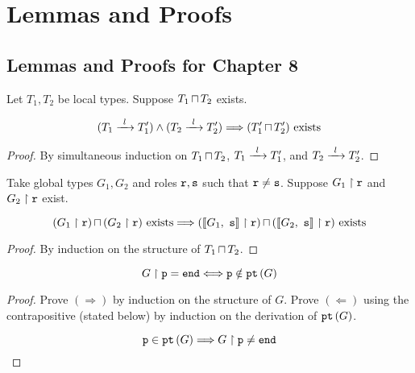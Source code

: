 \chapter{Lemmas and Proofs}

\section{Lemmas and Proofs for Chapter 8}
\label{section:proofs}

\begin{lemma}
Let $T_1, T_2$ be local types.
Suppose ${T_1}\,{\sqcap}\,{T_2}$ exists.

\[
(\treduce{T_1}{T'_1}{l}) \wedge (\treduce{T_2}{T'_2}{l})
	\Longrightarrow
(\tmerge{T'_1}{T'_2}) \text{ exists}
\]

\label{lem:localltspreservemerge}
\end{lemma}

\begin{proof}
By simultaneous induction on
${T_1}\,{\sqcap}\,{T_2}$, $\treduce{T_1}{T'_1}{l}$,
and $\treduce{T_2}{T'_2}{l}$.

\end{proof}

\begin{lemma}
Take global types $G_1, G_2$
and roles ${\mathtt{r}}, {\mathtt{s}}$ such that ${\mathtt{r}} \neq {\mathtt{s}}$.
Suppose ${G_1} \upharpoonright {\mathtt{r}}$ and ${G_2} \upharpoonright {\mathtt{r}}$ exist.

\[
{({G_1} \upharpoonright {\mathtt{r}})}\,{\sqcap}\,{({G_2} \upharpoonright {\mathtt{r}})} \text{ exists}
	\Longrightarrow
{( { \llbracket {G_1},~ {\mathtt{s}}  \rrbracket } \upharpoonright {\mathtt{r}}  )}\,{\sqcap}\,{({\llbracket {G_2},~{\mathtt{s}} \rrbracket} \upharpoonright {\mathtt{r}})} 
	\text{ exists}
\]

\label{lem:encglobalpreservemerge}
\end{lemma}

\begin{proof}
By induction on the structure of ${T_1}\,{\sqcap}\,{T_2}$.

\end{proof}

\begin{lemma}

\[
{G} \upharpoonright {\mathtt{p}} = \textnormal{\texttt{end}} \Longleftrightarrow {\mathtt{p}} \notin {\textnormal{\texttt{pt}}\left({G}\right)}
\]

\label{lem:projpt}
\end{lemma}

\begin{proof} 
Prove $(\Longrightarrow)$ by induction on the structure of $G$.
Prove $(\Longleftarrow)$ using the contrapositive (stated below)
by induction on the derivation of ${\textnormal{\texttt{pt}}\left({G}\right)}$.

\[
{\mathtt{p}} \in {\textnormal{\texttt{pt}}\left({G}\right)} \Longrightarrow {G} \upharpoonright {\mathtt{p}} \neq \textnormal{\texttt{end}}
\]
\end{proof}

